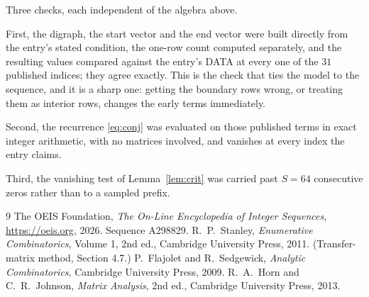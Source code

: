 \documentclass[11pt,a4paper]{article}
\theoremstyle{plain}
\theoremstyle{definition}
\begin{document}
Three checks, each independent of the algebra above.

First, the digraph, the start vector and the end vector were built directly from the
entry's stated condition, the one-row count computed separately, and the resulting values
compared against the entry's DATA at every one of the $31$ published indices; they
agree exactly. This is the check that ties the model to the sequence, and it is a sharp one:
getting the boundary rows wrong, or treating them as interior rows, changes the early terms
immediately.

Second, the recurrence \eqref{eq:conj} was evaluated on those published terms in exact
integer arithmetic, with no matrices involved, and vanishes at every index the entry claims.

Third, the vanishing test of Lemma~\ref{lem:crit} was carried past $S=64$ consecutive
zeros rather than to a sampled prefix.

\begin{thebibliography}{9}
 The OEIS Foundation, \emph{The On-Line Encyclopedia of Integer
Sequences}, \url{https://oeis.org}, 2026. Sequence A298829.
 R.~P.~Stanley, \emph{Enumerative Combinatorics}, Volume 1, 2nd ed.,
Cambridge University Press, 2011. (Transfer-matrix method, Section 4.7.)
 P.~Flajolet and R.~Sedgewick, \emph{Analytic Combinatorics}, Cambridge
University Press, 2009.
 R.~A.~Horn and C.~R.~Johnson, \emph{Matrix Analysis}, 2nd ed., Cambridge
University Press, 2013.
\end{thebibliography}
\end{document}
